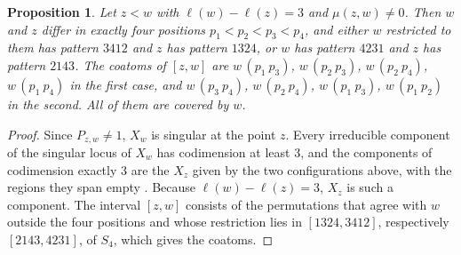 \documentclass[11pt]{amsart}
\newtheorem{proposition}[theorem]{Proposition}
\theoremstyle{definition}
\theoremstyle{remark}
\begin{document}
\begin{proposition}\label{prop:4crown}
Let $z<w$ with $\ell(w)-\ell(z)=3$ and $\mu(z,w)\ne0$. Then $w$ and $z$ differ in exactly four positions $p_1<p_2<p_3<p_4$, and either $w$ restricted to them has pattern $3412$ and $z$ has pattern $1324$, or $w$ has pattern $4231$ and $z$ has pattern $2143$. The coatoms of $[z,w]$ are $w\,(p_1\ p_3)$, $w\,(p_2\ p_3)$, $w\,(p_2\ p_4)$, $w\,(p_1\ p_4)$ in the first case, and $w\,(p_3\ p_4)$, $w\,(p_2\ p_4)$, $w\,(p_1\ p_3)$, $w\,(p_1\ p_2)$ in the second. All of them are covered by $w$.
\end{proposition}

\begin{proof}
Since $P_{z,w}\ne1$, $X_w$ is singular at the point $z$. Every irreducible component of the singular locus of $X_w$ has codimension at least $3$, and the components of codimension exactly $3$ are the $X_z$ given by the two configurations above, with the regions they span empty \cite{BW03,Man01,KLR03,Cor03}. Because $\ell(w)-\ell(z)=3$, $X_z$ is such a component. The interval $[z,w]$ consists of the permutations that agree with $w$ outside the four positions and whose restriction lies in $[1324,3412]$, respectively $[2143,4231]$, of $S_4$, which gives the coatoms.
\end{proof}
\end{document}
